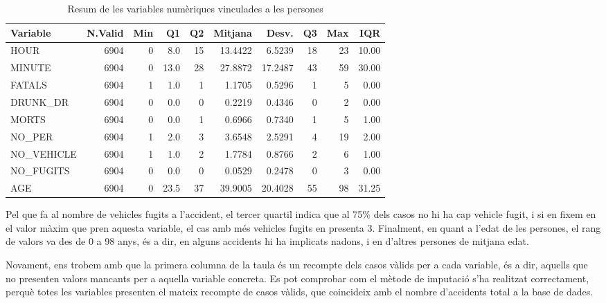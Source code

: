 \documentclass[12pt,longbibliography]{article}
\theoremstyle{definition}
\theoremstyle{remark}
\begin{document}
\begin{table}[H]
\centering
\begin{tabular}{lrrrrrrrrr}
\hline
Variable    & N.Valid & Min & Q1   & Q2 & Mitjana    & Desv. & Q3 & Max & IQR   \\ \hline
HOUR        & 6904    & 0   & 8.0  & 15      & 13.4422 & 6.5239       & 18 & 23  & 10.00 \\ \hline
MINUTE      & 6904    & 0   & 13.0 & 28      & 27.8872 & 17.2487      & 43 & 59  & 30.00 \\ \hline
FATALS      & 6904    & 1   & 1.0  & 1       & 1.1705  & 0.5296       & 1  & 5   & 0.00  \\ \hline
DRUNK\_DR   & 6904    & 0   & 0.0  & 0       & 0.2219  & 0.4346       & 0  & 2   & 0.00  \\ \hline
MORTS       & 6904    & 0   & 0.0  & 1       & 0.6966  & 0.7340       & 1  & 5   & 1.00  \\ \hline
NO\_PER     & 6904    & 1   & 2.0  & 3       & 3.6548  & 2.5291       & 4  & 19  & 2.00  \\ \hline
NO\_VEHICLE & 6904    & 1   & 1.0  & 2       & 1.7784  & 0.8766       & 2  & 6   & 1.00  \\ \hline
NO\_FUGITS  & 6904    & 0   & 0.0  & 0       & 0.0529  & 0.2478       & 0  & 3   & 0.00  \\ \hline
AGE         & 6904    & 0   & 23.5 & 37      & 39.9005 & 20.4028      & 55 & 98  & 31.25 \\ \hline
\end{tabular}
\caption{Resum de les variables numèriques vinculades a les persones}
\label{tab:num4-table}
\end{table}




Pel que fa al nombre de vehicles fugits a l'accident, el tercer quartil indica que al 75\% dels casos no hi ha cap vehicle fugit, i si en fixem en el valor màxim que pren aquesta variable, el cas amb més vehicles fugits en presenta 3. Finalment, en quant a l'edat de les persones, el rang de valors va des de 0 a 98 anys, és a dir, en alguns accidents hi ha implicats nadons, i en d'altres persones de mitjana edat. 

Novament, ens trobem amb que la primera columna de la taula és un recompte dels casos vàlids per a cada variable, és a dir, aquells que no presenten valors mancants per a aquella variable concreta. Es pot comprobar com el mètode de imputació s'ha realitzat correctament, perquè totes les variables presenten el mateix recompte de casos vàlids, que coincideix amb el nombre d'accidents total a la base de dades.
\end{document}
